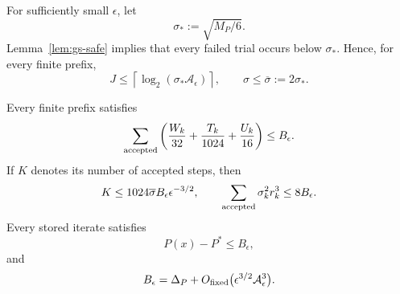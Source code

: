 For sufficiently small $\epsilon$, let
\[
    \sigma_*:=\sqrt{M_P/6}.
\]
Lemma~\ref{lem:gs-safe} implies that every failed trial occurs below
$\sigma_*$.
Hence, for every finite prefix,
\begin{equation}
    J
    \le
    \left\lceil
        \log_2(
            \sigma_*\mathcal A_\epsilon
        )
    \right\rceil,
    \qquad
    \sigma
    \le
    \overline\sigma
    :=
    2\sigma_*.
    \label{eq:gs-scale-bound}
\end{equation}

\begin{lemma}
\label{lem:gs-budget}
Every finite prefix satisfies
\begin{equation}
    \sum_{\rm accepted}
    \left(
        \frac{W_k}{32}
        +
        \frac{T_k}{1024}
        +
        \frac{U_k}{16}
    \right)
    \le
    B_\epsilon.
    \label{eq:gs-cumulative-budget}
\end{equation}
If $K$ denotes its number of accepted steps, then
\begin{equation}
    K
    \le
    1024\overline\sigma
    B_\epsilon
    \epsilon^{-3/2},
    \qquad
    \sum_{\rm accepted}
    \sigma_k^2r_k^3
    \le
    8B_\epsilon.
    \label{eq:gs-path-budget}
\end{equation}
Every stored iterate satisfies
\[
    P(x)-P^*
    \le
    B_\epsilon,
\]
and
\begin{equation}
    B_\epsilon
    =
    \Delta_P
    +
    O_{\rm fixed}
    \bigl(
        \epsilon^{3/2}\mathcal A_\epsilon^3
    \bigr).
    \label{eq:gs-budget-asymptotic-app}
\end{equation}
\end{lemma}

